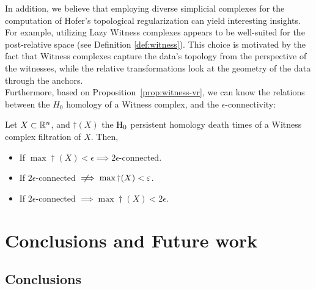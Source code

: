 \documentclass[../main.tex]{subfiles}
\begin{document}
In addition, we believe that employing diverse simplicial complexes for the computation of Hofer's topological regularization can yield interesting insights. For example, utilizing Lazy Witness complexes appears to be well-suited for the post-relative space (see Definition \ref{def:witness}). This choice is motivated by the fact that Witness complexes capture the data's topology from the perspective of the witnesses, while the relative transformations look at the geometry of the data through the anchors.\\

Furthermore, based on Proposition~\ref{prop:witness-vr}, we can know the relations between the $H_0$ homology of a Witness complex, and the $\epsilon$-connectivity:
\begin{corollary}
Let $X\subset \mathbb{R}^n$, and $\dag(X)$ the $\text{\rm H}_0$ persistent homology death times of a Witness complex filtration of $X$. Then,
\begin{itemize}
    \item If $\max \dag(X) < \epsilon \implies 2\epsilon$-connected.
    \item If $2\epsilon$-connected $\notimplies \max \dag(X) < \epsilon$.
    \item If $2\epsilon$-connected $\implies \max \dag(X) < 2\epsilon$.
\end{itemize}
\end{corollary}





\cleardoublepage
\chapter{Conclusions and Future work}
\label{ch:conclusionsAndFutureWork}


\section{Conclusions}
\label{sec:conclusions}


  
\end{document}
